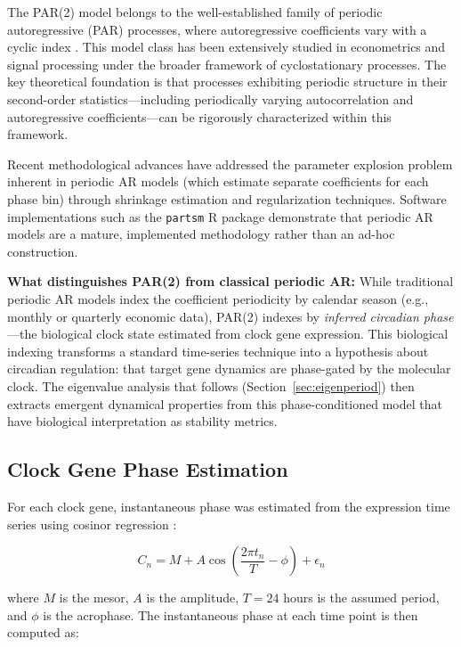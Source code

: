 \documentclass[11pt,a4paper]{article}
\begin{document}
The PAR(2) model belongs to the well-established family of periodic autoregressive (PAR) processes, where autoregressive coefficients vary with a cyclic index \citep{box1994, hurd2007}. This model class has been extensively studied in econometrics and signal processing under the broader framework of cyclostationary processes. The key theoretical foundation is that processes exhibiting periodic structure in their second-order statistics---including periodically varying autocorrelation and autoregressive coefficients---can be rigorously characterized within this framework.

Recent methodological advances have addressed the parameter explosion problem inherent in periodic AR models (which estimate separate coefficients for each phase bin) through shrinkage estimation \citep{paap2025shrinkage} and regularization techniques. Software implementations such as the \texttt{partsm} R package \citep{lopezdelacalle2005partsm} demonstrate that periodic AR models are a mature, implemented methodology rather than an ad-hoc construction.

\textbf{What distinguishes PAR(2) from classical periodic AR:} While traditional periodic AR models index the coefficient periodicity by calendar season (e.g., monthly or quarterly economic data), PAR(2) indexes by \textit{inferred circadian phase}---the biological clock state estimated from clock gene expression. This biological indexing transforms a standard time-series technique into a hypothesis about circadian regulation: that target gene dynamics are phase-gated by the molecular clock. The eigenvalue analysis that follows (Section~\ref{sec:eigenperiod}) then extracts emergent dynamical properties from this phase-conditioned model that have biological interpretation as stability metrics.

\subsection{Clock Gene Phase Estimation}

For each clock gene, instantaneous phase was estimated from the expression time series using cosinor regression \citep{cornelissen2014cosinor}:

\begin{equation}
C_n = M + A\cos\left(\frac{2\pi t_n}{T} - \phi\right) + \epsilon_n
\end{equation}

where $M$ is the mesor, $A$ is the amplitude, $T=24$ hours is the assumed period, and $\phi$ is the acrophase. The instantaneous phase at each time point is then computed as:
\end{document}
